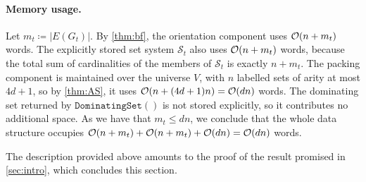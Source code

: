 \paragraph{Memory usage.}
Let $m_t\coloneqq|E(G_t)|$. By \cref{thm:bf},
the orientation component uses $\mathcal{O}(n+m_t)$ words.
The explicitly stored set system $\mathcal{S}_t$ also uses $\mathcal{O}(n+m_t)$ words, because the total sum of cardinalities of the members of $\mathcal{S}_t$ is exactly $n+m_t$. %
The packing component is maintained over the universe $V$, with $n$ labelled sets of arity at most $4d+1$, so by \cref{thm:AS}, it uses $\mathcal{O}(n+(4d+1)n)=\mathcal{O}(dn)$ words.
The dominating set returned by $\mathtt{DominatingSet()}$ is not stored explicitly, so it contributes no additional space. As we have that $m_t \le dn$, we conclude that the whole data structure occupies $\mathcal{O}(n+m_t)+\mathcal{O}(n+m_t)+\mathcal{O}(dn)=\mathcal{O}(dn)$ words.


The description provided above amounts to the proof of the result promised in \cref{sec:intro}, which concludes this section.

\mainApx*


